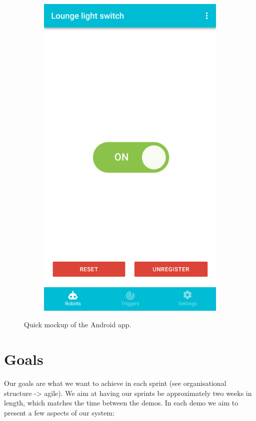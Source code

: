 \documentclass[onecolumn]{IEEEtran}
\begin{document}
\begin{figure}
\begin{subfigure}{.33\textwidth}
        \includegraphics[width=.9\linewidth]{app-3.png}
    \end{subfigure}
    \caption{Quick mockup of the Android app.}
    \label{fig:fig}
\end{figure}

\section{Goals}

Our goals are what we want to achieve in each sprint (see organisational structure -> agile). We aim at having our sprints be approximately two weeks in length, which matches the time between the demos. In each demo we aim to present a few aspects of our system:
\end{document}
